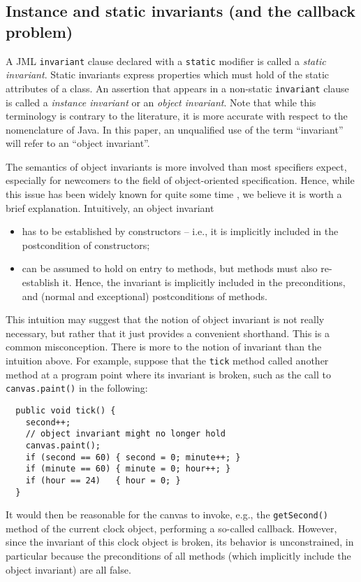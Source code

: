 \documentclass{llncs}
\begin{document}
\subsection{Instance and static invariants (and the callback problem)}

A JML \texttt{invariant} clause declared with a
\texttt{static} modifier is called a \emph{static invariant}.
%
Static invariants express properties which must hold of the static
attributes of a class.
%
An assertion that appears in a non-static \texttt{invariant} clause is called
a \emph{instance invariant} or an \emph{object invariant}.
%
Note that while this terminology is contrary to the literature, it is more
accurate with respect to the nomenclature of Java.  In this paper, an
unqualified use of the term ``invariant'' will refer to an ``object
invariant''.

The semantics of object invariants is more involved than most specifiers
expect, especially for newcomers to the field of object-oriented specification.
Hence, while this issue has been widely known for quite some time
\cite{Szyperski98}, we believe it is worth a brief explanation.
%
Intuitively, an object invariant
\begin{itemize}
  \item  has to be established by constructors -- i.e., it is implicitly
    included in the postcondition of constructors;
  \item can be assumed to hold on entry to methods, but methods must also
    re-establish it. Hence, the invariant is implicitly included in the
    preconditions, and (normal and exceptional) postconditions of methods.
\end{itemize}

This intuition may suggest that the notion of object invariant is not really
necessary, but rather that it just provides a convenient shorthand.  This is a
common misconception.
%
There is more to the notion of invariant than the intuition above.
%
For example, suppose that the \texttt{tick} method called another method
at a program point where its invariant is broken, such as the call to
\texttt{canvas.paint()} in the following:
\begin{verbatim}
  public void tick() {
    second++;
    // object invariant might no longer hold
    canvas.paint();
    if (second == 60) { second = 0; minute++; }
    if (minute == 60) { minute = 0; hour++; }
    if (hour == 24)   { hour = 0; }
  }
\end{verbatim}
It would then be reasonable for the canvas to invoke, e.g., the
\texttt{getSecond()} method of the current clock object, performing a so-called 
callback. 
However, since the invariant of this clock object is broken, its behavior is
unconstrained, in particular because the preconditions of all methods (which
implicitly include the object invariant) are all false.
\end{document}
